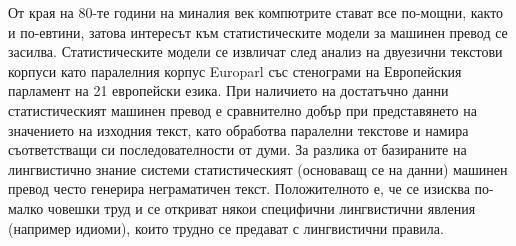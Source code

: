 \documentclass[]{../../metanetpaper}
\begin{document}
\begin{multicols}{2}
От края на 80-те години на миналия век компютрите стават все по-мощни, както и по-евтини, затова интересът към статистическите модели за машинен превод се засилва. Статистическите модели се извличат
 след анализ на двуезични текстови корпуси като
 паралелния корпус Europarl със стенограми на
 Европейския парламент на 21 европейски езика. При наличието на достатъчно данни статистическият машинен превод е сравнително добър при представянето на значението на изходния текст, като обработва паралелни текстове и намира съответстващи си последователности от думи. За разлика от базираните на лингвистично знание системи статистическият (основаващ се на данни) машинен превод често генерира неграматичен текст. Положителното е, че се изисква по-малко човешки труд и се откриват някои специфични лингвистични явления (например идиоми), които трудно се предават с лингвистични правила. 



\end{multicols}
\end{document}
